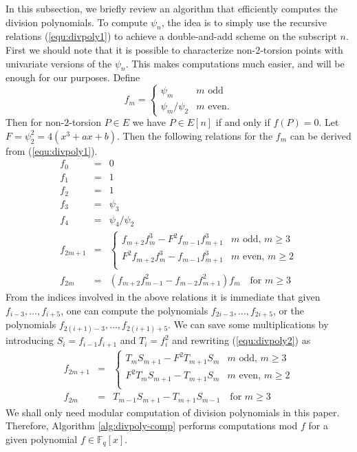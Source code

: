 \documentclass[12pt]{article}
\theoremstyle{plain}
\theoremstyle{definition}
\def\F{\ensuremath{\mathbb{F}}}
\begin{document}
In this subsection, we briefly review an algorithm that efficiently computes the division 
polynomials. To compute $\psi_n$, the idea is to simply use the recursive relations 
(\ref{equ:divpoly1}) to achieve a double-and-add scheme on the subscript $n$. First we should note 
that it is possible to characterize non-$2$-torsion points with univariate versions of the 
$\psi_n$. This makes computations much easier, and will be enough for our purposes. Define
\[
f_m = 
\begin{cases}
	\psi_m & m \text{ odd} \\
	\psi_m / \psi_2 & m \text{ even}.
\end{cases}
\]
Then for non-$2$-torsion $P \in E$ we have $P \in E[n]$ if and only if $f(P) = 0$. Let $F = 
\psi_2^2 = 4(x^3 + ax + b)$. Then the following relations for the $f_m$ can be derived from 
(\ref{equ:divpoly1}).
\begin{equation}
\label{equ:divpoly2}
	\begin{array}{rll}
		f_0 & = & 0 \\
		f_1 & = & 1 \\
		f_2 & = & 1 \\
		f_3 & = & \psi_3 \\
		f_4 & = & \psi_4 / \psi_2 \\
		f_{2m + 1} & = & 
		\begin{cases}
			f_{m + 2}f_m^3 - F^2f_{m - 1}f_{m + 1}^3 & m \text{ odd, } m \ge 3 \\
			F^2f_{m + 2}f_m^3 - f_{m - 1}f_{m + 1}^3 & m \text{ even, } m \ge 2 \\
		\end{cases} \\
		f_{2m} & = & (f_{m + 2}f_{m - 1}^2 - f_{m - 2}f_{m + 1}^2)f_m \quad \text{for } m \ge 3
	\end{array}
\end{equation}
From the indices involved in the above relations it is immediate that given $f_{i - 3}, \dots, f_{i 
+ 5}$, one can compute the polynomials $f_{2i - 3}, \dots, f_{2i + 5}$, or the polynomials $f_{2(i 
+ 1) - 3}, \dots, f_{2(i + 1) + 5}$. We can save some multiplications by introducing $S_i = f_{i - 
1}f_{i + 1}$ and $T_i = f_i^2$ and rewriting (\ref{equ:divpoly2}) as
\begin{equation}
\label{equ:divpoly3}
\begin{array}{rll}
	f_{2m + 1} & = & 
	\begin{cases}
		T_mS_{m + 1} - F^2T_{m + 1}S_m & m \text{ odd, } m \ge 3 \\
		F^2T_mS_{m + 1} - T_{m + 1}S_m & m \text{ even, } m \ge 2 \\
	\end{cases} \\
	f_{2m} & = & T_{m - 1}S_{m + 1} - T_{m + 1}S_{m - 1} \quad \text{for } m \ge 3
\end{array}
\end{equation}
We shall only need modular computation of division polynomials in this paper. Therefore, Algorithm 
\ref{alg:divpoly-comp} performs computations mod $f$ for a given polynomial $f \in \F_q[x]$.
\end{document}

